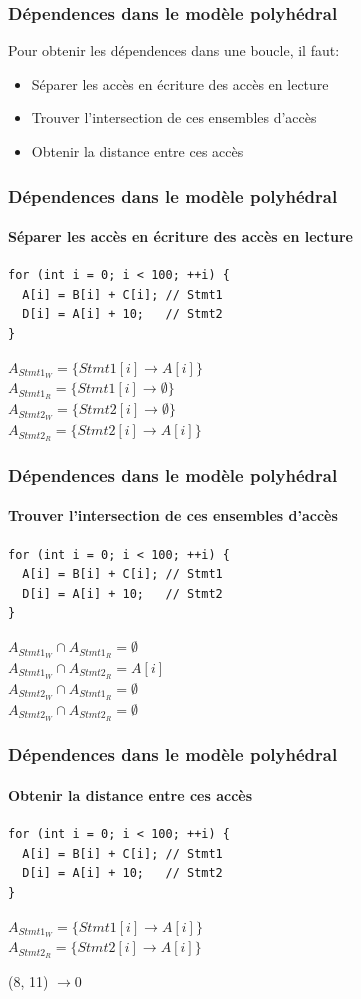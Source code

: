 \documentclass{beamer}
\begin{document}
\begin{frame}
\frametitle{Dépendences dans le modèle polyhédral}
Pour obtenir les dépendences dans une boucle, il faut:
\begin{itemize}
\item Séparer les accès en écriture des accès en lecture
\item Trouver l'intersection de ces ensembles d'accès
\item Obtenir la distance entre ces accès
\end{itemize}
\end{frame}

\begin{frame}[fragile]
\frametitle{Dépendences dans le modèle polyhédral}
\framesubtitle{Séparer les accès en écriture des accès en lecture}
\begin{lstlisting}
for (int i = 0; i < 100; ++i) {
  A[i] = B[i] + C[i]; // Stmt1
  D[i] = A[i] + 10;   // Stmt2
}
\end{lstlisting}
$A_{Stmt1_W} = \{Stmt1[i] \rightarrow A[i] \}$\\
$A_{Stmt1_R} = \{Stmt1[i] \rightarrow \emptyset \}$\\
\vspace{0.2cm}
$A_{Stmt2_W} = \{Stmt2[i] \rightarrow \emptyset \}$\\
$A_{Stmt2_R} = \{Stmt2[i] \rightarrow A[i] \}$\\
\end{frame}

\begin{frame}[fragile]
\frametitle{Dépendences dans le modèle polyhédral}
\framesubtitle{Trouver l'intersection de ces ensembles d'accès}
\begin{lstlisting}
for (int i = 0; i < 100; ++i) {
  A[i] = B[i] + C[i]; // Stmt1
  D[i] = A[i] + 10;   // Stmt2
}
\end{lstlisting}
$A_{Stmt1_W} \cap A_{Stmt1_R} = \emptyset $\\
$A_{Stmt1_W} \cap A_{Stmt2_R} = A[i] $\\
$A_{Stmt2_W} \cap A_{Stmt1_R} = \emptyset $\\
$A_{Stmt2_W} \cap A_{Stmt2_R} = \emptyset $\\
\end{frame}

\begin{frame}[fragile]
\frametitle{Dépendences dans le modèle polyhédral}
\framesubtitle{Obtenir la distance entre ces accès}
\begin{lstlisting}
for (int i = 0; i < 100; ++i) {
  A[i] = B[i] + C[i]; // Stmt1
  D[i] = A[i] + 10;   // Stmt2
}
\end{lstlisting}
$A_{Stmt1_W} = \{Stmt1[i] \rightarrow A[i] \}$\\
$A_{Stmt2_R} = \{Stmt2[i] \rightarrow A[i] \}$\\
\begin{textblock}{6}(8, 11)
\huge{$\rightarrow 0$}
\end{textblock}
\end{frame}
\end{document}
